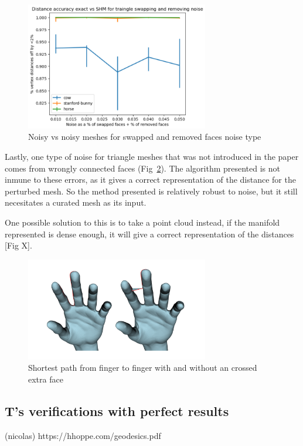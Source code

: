 \documentclass[sigconf]{acmart}
\begin{document}
\begin{figure}
  \centering
  \includegraphics[width=8cm]{original_vs_original_swapped_and_removed_triangles.png}
  \caption{Noisy vs noisy meshes for swapped and removed faces noise type}
  \label{fig:noisy_vs_noisy_swapped_and_removed}
\end{figure}

Lastly, one type of noise for triangle meshes that was not introduced in the paper comes from
wrongly connected faces (Fig~\ref{fig:hands}). The algorithm presented is not inmune to these errors,
as it gives a correct representation of the distance for the perturbed mesh. So the method
presented is relatively robust to noise, but it still necesitates a curated mesh as its input. 

One possible solution to this is to take a point cloud instead, if the manifold represented is
dense enough, it will give a correct representation of the distances [Fig X].

\begin{figure}
  \centering
  \includegraphics[width=8cm]{hands.png}
  \caption{Shortest path from finger to finger with and without an crossed extra face}
  \label{fig:hands}
\end{figure}


\subsection{T's verifications with perfect results}
(nicolas)
https://hhoppe.com/geodesics.pdf
\end{document}
